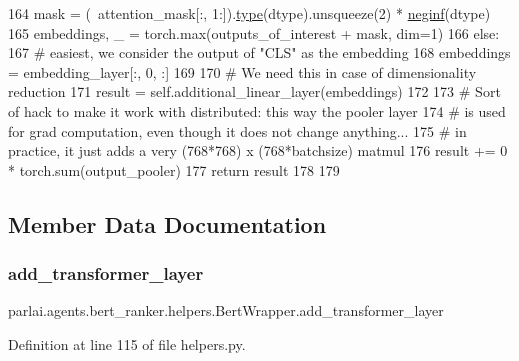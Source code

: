 \begin{DoxyCode}
164             mask = (~attention\_mask[:, 1:]).\hyperlink{namespaceparlai_1_1agents_1_1tfidf__retriever_1_1build__tfidf_ad5dfae268e23f506da084a9efb72f619}{type}(dtype).unsqueeze(2) * 
      \hyperlink{namespaceparlai_1_1utils_1_1torch_a6c6e25115353dba479cd72dc31dc76ae}{neginf}(dtype)
165             embeddings, \_ = torch.max(outputs\_of\_interest + mask, dim=1)
166         \textcolor{keywordflow}{else}:
167             \textcolor{comment}{# easiest, we consider the output of "CLS" as the embedding}
168             embeddings = embedding\_layer[:, 0, :]
169 
170         \textcolor{comment}{# We need this in case of dimensionality reduction}
171         result = self.additional\_linear\_layer(embeddings)
172 
173         \textcolor{comment}{# Sort of hack to make it work with distributed: this way the pooler layer}
174         \textcolor{comment}{# is used for grad computation, even though it does not change anything...}
175         \textcolor{comment}{# in practice, it just adds a very (768*768) x (768*batchsize) matmul}
176         result += 0 * torch.sum(output\_pooler)
177         \textcolor{keywordflow}{return} result
178 
179 
\end{DoxyCode}


\subsection{Member Data Documentation}
\mbox{\label{classparlai_1_1agents_1_1bert__ranker_1_1helpers_1_1BertWrapper_ae1ec954dac72452d7b156a15f488c024}} 
\subsubsection{\texorpdfstring{add\+\_\+transformer\+\_\+layer}{add\_transformer\_layer}}
{\footnotesize\ttfamily parlai.\+agents.\+bert\+\_\+ranker.\+helpers.\+Bert\+Wrapper.\+add\+\_\+transformer\+\_\+layer}



Definition at line 115 of file helpers.\+py.

